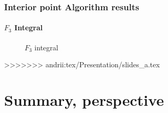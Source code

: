 \documentclass[10pt]{beamer}
\newcommand{\rfn}{\setcounter{footnote}{0}}
\begin{document}
\begin{frame}
\begin{frame}
  \frametitle{Interior point Algorithm results}
  \rfn
  \framesubtitle{$F_3$ Integral}
  \begin{figure}
    \centering
    \label{some example}
    \caption{$F_3$ integral}
  \end{figure}
>>>>>>> andrii:tex/Presentation/slides_a.tex
\end{frame}


\section{Summary, perspective}


\end{frame}
\end{document}
